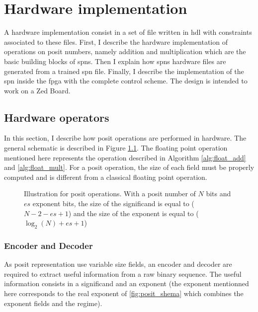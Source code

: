
\chapter{Hardware implementation}
\label{cha:hard}

A hardware implementation consist in a set of file written in \gls{hdl} with constraints associated to these files. First, I describe the hardware implementation of operations on posit numbers, namely addition and multiplication which are the basic building blocks of \glspl{spn}. Then I explain how \glspl{spn} hardware files are generated from a trained \gls{spn} file. Finally, I describe the implementation of the \gls{spn} inside the \gls{fpga} with the complete control scheme. The design is intended to work on a Zed Board.

\section{Hardware operators}

In this section, I describe how posit operations are performed in hardware. The general schematic is described in Figure \ref{fig:posit_op}. The floating point operation mentioned here represents the operation described in Algorithm \ref{alg:float_add} and \ref{alg:float_mult}. For a posit operation, the size of each field must be properly computed and is different from a classical floating point operation.

\begin{figure}[!ht]
\begin{mdframed}
	\centering
	
	\caption{Illustration for posit operations. With a posit number of $N$ bits and $es$ exponent bits, the size of the significand is equal to ($N-2-es+1$) and the size of the exponent is equal to ($\log_2(N)+es+1$)}
	\label{fig:posit_op}
\end{mdframed}
\end{figure}

\subsection{Encoder and Decoder}
As posit representation use variable size fields, an encoder and decoder are required to extract useful information from a raw binary sequence. The useful information consists in a significand and an exponent (the exponent mentionned here corresponds to the real exponent of \ref{fig:posit_shema} which combines the exponent fields and the regime).

